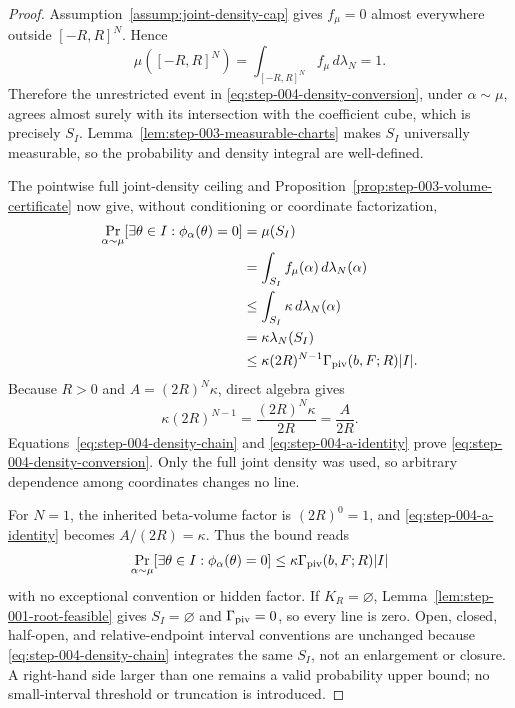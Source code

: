 \begin{proof}
Assumption~\ref{assump:joint-density-cap} gives
$f_\mu=0$ almost everywhere outside $[-R,R]^N$.  Hence
\begin{equation}
\mu([-R,R]^N)
=\int_{[-R,R]^N}f_\mu\,d\lambda_N=1.
\label{eq:step-004-cube-support}
\end{equation}
Therefore the unrestricted event in
\eqref{eq:step-004-density-conversion}, under $\alpha\sim\mu$, agrees almost
surely with its intersection with the coefficient cube, which is precisely
$S_I$.  Lemma~\ref{lem:step-003-measurable-charts} makes $S_I$ universally
measurable, so the probability and density integral are well-defined.

The pointwise full joint-density ceiling and
Proposition~\ref{prop:step-003-volume-certificate} now give, without
conditioning or coordinate factorization,
\begin{equation}
\begin{aligned}
\Pr_{\alpha\sim\mu}\!\left[
  \exists\theta\in I:\phi_\alpha(\theta)=0
\right]
&=\mu(S_I)\\
&=\int_{S_I}f_\mu(\alpha)\,d\lambda_N(\alpha)\\
&\leq\int_{S_I}\kappa\,d\lambda_N(\alpha)\\
&=\kappa\lambda_N(S_I)\\
&\leq\kappa(2R)^{N-1}
\Gamma_{\rm piv}(b,F;R)|I|.
\end{aligned}
\label{eq:step-004-density-chain}
\end{equation}
Because $R>0$ and $A=(2R)^N\kappa$, direct algebra gives
\begin{equation}
\kappa(2R)^{N-1}
=\frac{(2R)^N\kappa}{2R}
=\frac A{2R}.
\label{eq:step-004-a-identity}
\end{equation}
Equations~\eqref{eq:step-004-density-chain} and
\eqref{eq:step-004-a-identity} prove
\eqref{eq:step-004-density-conversion}.  Only the full joint density was
used, so arbitrary dependence among coordinates changes no line.

For $N=1$, the inherited beta-volume factor is $(2R)^0=1$, and
\eqref{eq:step-004-a-identity} becomes $A/(2R)=\kappa$.  Thus the bound
reads
\[
\Pr_{\alpha\sim\mu}\!\left[
  \exists\theta\in I:\phi_\alpha(\theta)=0
\right]
\leq\kappa\Gamma_{\rm piv}(b,F;R)|I|
\]
with no exceptional convention or hidden factor.  If $K_R=\varnothing$,
Lemma~\ref{lem:step-001-root-feasible} gives $S_I=\varnothing$ and
$\Gamma_{\rm piv}=0$, so every line is zero.  Open, closed, half-open, and
relative-endpoint interval conventions are unchanged because
\eqref{eq:step-004-density-chain} integrates the same $S_I$, not an
enlargement or closure.  A right-hand side larger than one remains a valid
probability upper bound; no small-interval threshold or truncation is
introduced.
\end{proof}

